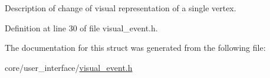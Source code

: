 Description of change of visual representation of a single vertex. 

Definition at line 30 of file visual\+\_\+event.\+h.



The documentation for this struct was generated from the following file\+:\begin{DoxyCompactItemize}
\item 
core/user\+\_\+interface/\hyperlink{visual__event_8h}{visual\+\_\+event.\+h}\end{DoxyCompactItemize}
